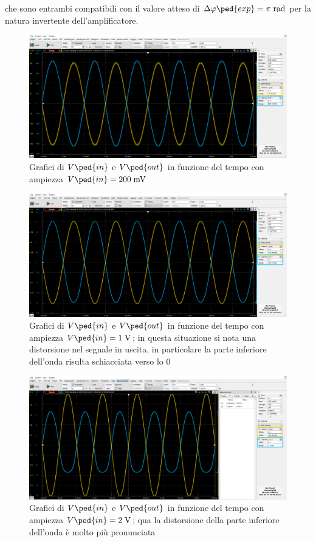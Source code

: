 \documentclass[10pt, a4paper, italian]{article}
\begin{document}
che sono entrambi compatibili con il valore atteso di $\Delta \phi\ped{exp}
= \pi \; \si{\radian}$ per la natura invertente dell'amplificatore.
\begin{figure}[htbp]
    \centering
	\includegraphics[scale=0.4]{amp.200}
    \caption{Grafici di $V\ped{in}$ e $V\ped{out}$ in funzione del tempo con ampiezza $V\ped{in}=200 \; \si{m\V}$}
\end{figure}
\begin{figure}[htbp]
    \centering
	\includegraphics[scale=0.4]{amp.1000}
    \caption{Grafici di $V\ped{in}$ e $V\ped{out}$ in funzione del tempo con ampiezza $V\ped{in}=1 \; \si{\V}$; in questa situazione si nota una distorsione nel segnale in uscita, in particolare la parte inferiore dell'onda risulta schiacciata verso lo 0}
\end{figure}
\begin{figure}[htbp]
    \centering
	\includegraphics[scale=0.4]{amp.2000}
    \caption{Grafici di $V\ped{in}$ e $V\ped{out}$ in funzione del tempo con ampiezza $V\ped{in}=2 \; \si{\V}$; qua la distorsione della parte inferiore dell'onda è molto più pronunciata}
\end{figure}
\end{document}
